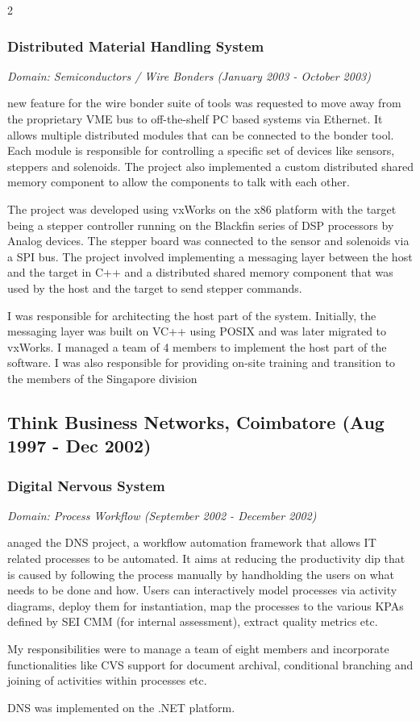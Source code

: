 \documentclass[a4paper,11pt]{article}
\newcommand\cvsubsection[3]{\subsection*{#1 \quad \small{(#2 - #3)}}}
\newcommand\cvprojectentry[5]{
  \subsubsection*{#1}
  
  \vspace{-7pt}
  
  \it{Domain: #2}\normalfont{} \quad (#3 - #4)
  
}
\begin{document}
\begin{multicols}{2}
\cvprojectentry{Distributed Material Handling System}{Semiconductors / Wire Bonders}{January 2003}{October 2003}

A new feature for the wire bonder suite of tools was requested to
move away from the proprietary VME bus to off-the-shelf PC based
systems via Ethernet. It allows multiple distributed modules that can
be connected to the bonder tool. Each module is responsible for
controlling a specific set of devices like sensors, steppers and
solenoids. The project also implemented a custom distributed shared
memory component to allow the components to talk with each other.
 
The project was developed using vxWorks on the x86 platform with the
target being a stepper controller running on the Blackfin series of
DSP processors by Analog devices. The stepper board was connected to
the sensor and solenoids via a SPI bus. The project involved
implementing a messaging layer between the host and the target in C++
and a distributed shared memory component that was used by the host
and the target to send stepper commands.
 
I was responsible for architecting the host part of the
system. Initially, the messaging layer was built on VC++ using POSIX
and was later migrated to vxWorks. I managed a team of 4 members to
implement the host part of the software. I was also responsible for
providing on-site training and transition to the members of the
Singapore division

\cvsubsection{Think Business Networks, Coimbatore}{Aug 1997}{Dec 2002}

\cvprojectentry{Digital Nervous System}{Process Workflow}{September 2002}{December 2002}
 
Managed the DNS project, a workflow automation framework that allows
IT related processes to be automated. It aims at reducing the
productivity dip that is caused by following the process manually by
handholding the users on what needs to be done and how. Users can
interactively model processes via activity diagrams, deploy them for
instantiation, map the processes to the various KPAs defined by SEI
CMM (for internal assessment), extract quality metrics etc.
 
My responsibilities were to manage a team of eight members and
incorporate functionalities like CVS support for document archival,
conditional branching and joining of activities within processes etc.
 
DNS was implemented on the .NET platform. 
 

\end{multicols}
\end{document}
